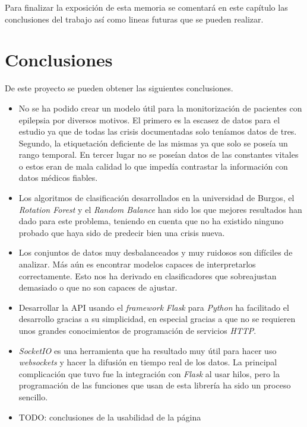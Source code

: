 
Para finalizar la exposición de esta memoria se comentará en este capítulo las conclusiones del trabajo así como lineas futuras que se pueden realizar.

\section{Conclusiones}
De este proyecto se pueden obtener las siguientes conclusiones.
\begin{itemize}
	\item No se ha podido crear un modelo útil para la monitorización de pacientes con epilepsia por diversos motivos. El primero es la escasez de datos para el estudio ya que de todas las crisis documentadas solo teníamos datos de tres. Segundo, la etiquetación deficiente de las mismas ya que solo se poseía un rango temporal. En tercer lugar no se poseían datos de las constantes vitales o estos eran de mala calidad lo que impedía contrastar la información con datos médicos fiables.
	\item Los algoritmos de clasificación desarrollados en la universidad de Burgos, el \textit{Rotation Forest} y el \textit{Random Balance} han sido los que mejores resultados han dado para este problema, teniendo en cuenta que no ha existido ninguno probado que haya sido de predecir bien una crisis nueva.
	\item Los conjuntos de datos muy desbalanceados y muy ruidosos son difíciles de analizar. Más aún es encontrar modelos capaces de interpretarlos correctamente. Esto nos ha derivado en clasificadores que sobreajustan demasiado o que no son capaces de ajustar.
	\item Desarrollar la API usando el \textit{framework} \textit{Flask} para \textit{Python} ha facilitado el desarrollo gracias a su simplicidad, en especial gracias a que no se requieren unos grandes conocimientos de programación de servicios \textit{HTTP}.
	\item \textit{SocketIO} es una herramienta que ha resultado muy útil para hacer uso \textit{websockets} y hacer la difusión en tiempo real de los datos. La principal complicación que tuvo fue la integración con \textit{Flask} al usar hilos, pero la programación de las funciones que usan de esta librería ha sido un proceso sencillo. 
	\item TODO: conclusiones de la usabilidad de la página
\end{itemize}

